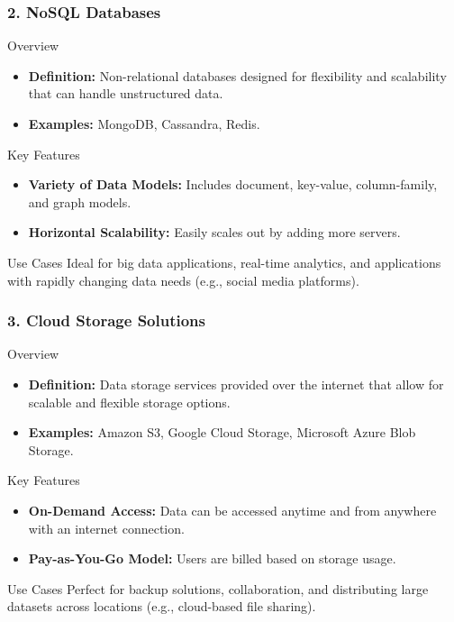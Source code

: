 \documentclass[aspectratio=169]{beamer}
\begin{document}
\begin{frame}[fragile]
    \frametitle{2. NoSQL Databases}
    \begin{block}{Overview}
        \begin{itemize}
            \item \textbf{Definition:} Non-relational databases designed for flexibility and scalability that can handle unstructured data.
            \item \textbf{Examples:} MongoDB, Cassandra, Redis.
        \end{itemize}
    \end{block}

    \begin{block}{Key Features}
        \begin{itemize}
            \item \textbf{Variety of Data Models:} Includes document, key-value, column-family, and graph models.
            \item \textbf{Horizontal Scalability:} Easily scales out by adding more servers.
        \end{itemize}
    \end{block}

    \begin{block}{Use Cases}
        Ideal for big data applications, real-time analytics, and applications with rapidly changing data needs (e.g., social media platforms).
    \end{block}
\end{frame}

\begin{frame}[fragile]
    \frametitle{3. Cloud Storage Solutions}
    \begin{block}{Overview}
        \begin{itemize}
            \item \textbf{Definition:} Data storage services provided over the internet that allow for scalable and flexible storage options.
            \item \textbf{Examples:} Amazon S3, Google Cloud Storage, Microsoft Azure Blob Storage.
        \end{itemize}
    \end{block}

    \begin{block}{Key Features}
        \begin{itemize}
            \item \textbf{On-Demand Access:} Data can be accessed anytime and from anywhere with an internet connection.
            \item \textbf{Pay-as-You-Go Model:} Users are billed based on storage usage.
        \end{itemize}
    \end{block}

    \begin{block}{Use Cases}
        Perfect for backup solutions, collaboration, and distributing large datasets across locations (e.g., cloud-based file sharing).
    \end{block}
\end{frame}
\end{document}
